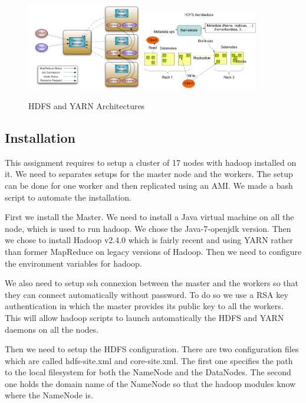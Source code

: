 \documentclass{article}
\begin{document}
\begin{figure}[!ht]
   \centering
   \includegraphics[width=0.45\textwidth]{YARNArch.png}
   \includegraphics[width=0.45\textwidth]{hdfsarchitecture.png}
\caption{HDFS and YARN Architectures}
\end{figure}


\subsection{Installation}

This assignment requires to setup a cluster of 17 nodes with hadoop installed on it. We need to separates setups for the master node and the workers. The setup can be done for one worker and then replicated using an AMI. We made a bash script to automate the installation.

First we install the Master. We need to install a Java virtual machine on all the node, which is used to run hadoop. We chose the Java-7-openjdk version. Then we chose to install Hadoop v2.4.0 which is fairly recent and using YARN rather than former MapReduce on legacy versions of Hadoop. Then we need to configure the environment variables for hadoop.

We also need to setup ssh connexion between the master and the workers so that they can connect automatically without password. To do so we use a RSA key authentication in which the master provides its public key to all the workers. This will allow hadoop scripts to launch automatically the HDFS and YARN daemons on all the nodes.

Then we need to setup the HDFS configuration. There are two configuration files which are called hdfs-site.xml and core-site.xml. The first one specifies the path to the local filesystem for both the NameNode and the DataNodes. The second one holds the domain name of the NameNode so that the hadoop modules know where the NameNode is.
\end{document}
